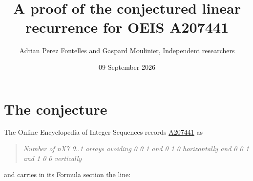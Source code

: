 \documentclass[11pt]{article}
\title{A proof of the conjectured linear recurrence for OEIS A207441}
\author{Adrian Perez Fontelles and Gaspard Moulinier, Independent researchers}
\date{09 September 2026}
\theoremstyle{definition}
\begin{document}
\maketitle
\section{The conjecture}

The Online Encyclopedia of Integer Sequences records \href{https://oeis.org/A207441}{A207441} as

\begin{quote}\itshape Number of nX7 0..1 arrays avoiding 0 0 1 and 0 1 0 horizontally and 0 0 1 and 1 0 0 vertically\end{quote}

and carries in its Formula section the line:
\end{document}
